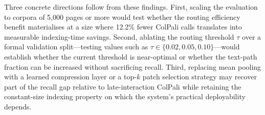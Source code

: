 \documentclass[conference]{IEEEtran}
\begin{document}
Three concrete directions follow from these findings. First, scaling the evaluation to corpora of 5,000 pages or more would test whether the routing efficiency benefit materialises at a size where 12.2\% fewer ColPali calls translates into measurable indexing-time savings. Second, ablating the routing threshold $\tau$ over a formal validation split—testing values such as $\tau \in \{0.02, 0.05, 0.10\}$—would establish whether the current threshold is near-optimal or whether the text-path fraction can be increased without sacrificing recall. Third, replacing mean pooling with a learned compression layer or a top-$k$ patch selection strategy may recover part of the recall gap relative to late-interaction ColPali while retaining the constant-size indexing property on which the system's practical deployability depends.
 
\end{document}
